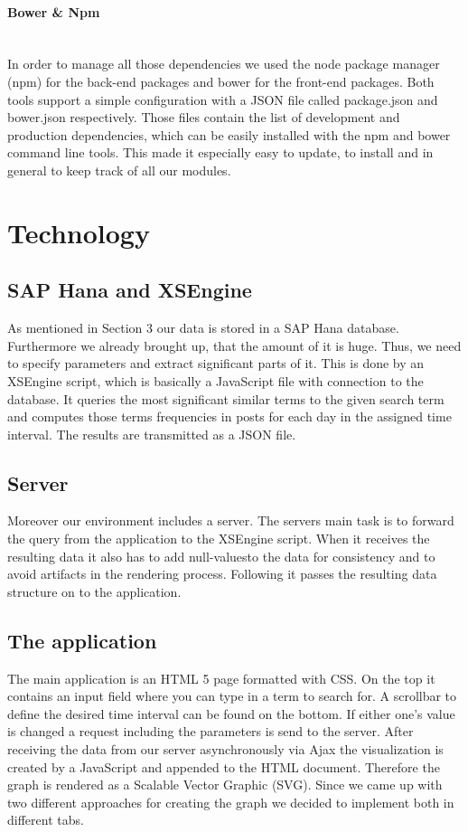 \documentclass{llncs}
\newcommand{\myparagraph}[1]{\paragraph{#1}\mbox{}\\}
\begin{document}
\myparagraph{Bower \& Npm}
In order to manage all those dependencies we used the node package manager (npm) for the back-end packages and bower for the front-end packages. Both tools support a simple configuration with a JSON file called package.json and bower.json respectively. Those files contain the list of development and production dependencies, which can be easily installed with the npm and bower command line tools.
This made it especially easy to update, to install and in general to keep track of all our modules.



\section{Technology}

\subsection{SAP Hana and XSEngine}
As mentioned in Section 3 our data is stored in a SAP Hana database. Furthermore we already brought up, that the amount of it is huge. Thus, we need to specify parameters and extract significant parts of it. This is done by an XSEngine script, which is basically a JavaScript file with connection to the database. It queries the most significant similar terms to the given search term and computes those term\grq s frequencies in posts for each day in the assigned time interval. The results are transmitted as a JSON file.

\subsection{Server}
Moreover our environment includes a server. The server\grq s main task is to forward the query from the application to the XSEngine script. When it receives the resulting data it also has to add \grqq null-values\grqq  to the data for consistency and to avoid artifacts in the rendering process. Following it passes the resulting data structure on to the application.

\subsection{The application}
The main application is an HTML 5 page formatted with CSS. On the top it contains an input field where you can type in a term to search for. A scrollbar to define the desired time interval can be found on the bottom. If either one's value is changed a request including the parameters is send to the server. After receiving the data from our server asynchronously via Ajax the visualization is created by a JavaScript and appended to the HTML document. Therefore the graph is rendered as a Scalable Vector Graphic (SVG). Since we came up with two different approaches for creating the graph we decided to implement both in different tabs.
\end{document}
